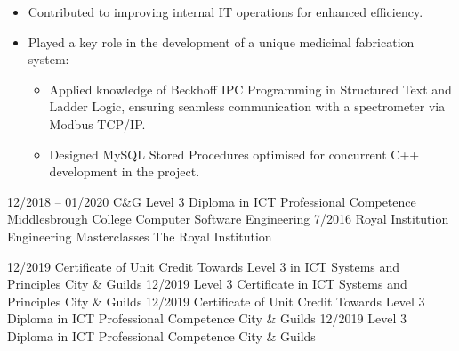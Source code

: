 \documentclass[9pt]{developercv} %
\begin{document}
\begin{entrylist}
{		\begin{itemize}
		    \item[\ding{117}] Contributed to improving internal IT operations for enhanced efficiency.
		    \item[\ding{117}] Played a key role in the development of a unique medicinal fabrication system:
		    \begin{itemize}
		        \item[\ding{118}] Applied knowledge of Beckhoff IPC Programming in Structured Text and Ladder Logic, ensuring seamless communication with a spectrometer via Modbus TCP/IP.
		        \item[\ding{118}] Designed MySQL Stored Procedures optimised for concurrent C++ development in the project.
		    \end{itemize}
		\end{itemize}

		\vspace{1em}
		\hspace{2em}
		\vspace{1em}
		}
		

\end{entrylist}

\vspace{0.5cm}	




\begin{entrylist}
	\entry
		{12/2018 -- 01/2020}
		{C\&G Level 3 Diploma in ICT Professional Competence}
		{Middlesbrough College}
		{Computer Software Engineering}
	\entry
		{7/2016}
		{Royal Institution Engineering Masterclasses}
		{The Royal Institution}
		{}
\end{entrylist}

\begin{entrylist}
	\entry
		{12/2019}
		{Certificate of Unit Credit Towards Level 3 in ICT Systems and Principles}
		{City \& Guilds}
		{}
	\entry
		{12/2019}
		{Level 3 Certificate in ICT Systems and Principles}
		{City \& Guilds}
		{}
	\entry
		{12/2019}
		{Certificate of Unit Credit Towards Level 3 Diploma in ICT Professional Competence}
		{City \& Guilds}
		{}
	\entry
		{12/2019}
		{Level 3 Diploma in ICT Professional Competence}
		{City \& Guilds}
		{}
\end{entrylist}

\vspace{0.5cm}	

\end{document}
